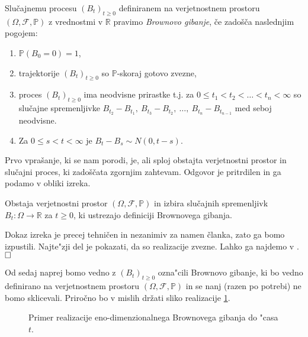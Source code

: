 \documentclass[twoside,11pt]{article}
\begin{document}
\pagebreak

\begin{definicija}
    Slučajnemu procesu $(B_t)_{t\geq 0}$ definiranem na verjetnostnem prostoru $(\Omega, \mathcal{F}, \mathbb{P})$
    z vrednostmi v $\mathbb{R}$ pravimo \textit{Brownovo gibanje}, če 
    zadošča naslednjim pogojem:
    \begin{enumerate}
        \item $\mathbb{P}(B_0 = 0) = 1$,
        \item trajektorije $(B_t)_{t\geq0}$ so $\mathbb{P}$-skoraj gotovo zvezne,
        \item proces $\left(B_t\right)_{t \geq 0}$ ima neodvisne prirastke t.j. za $0 \leq t_1 < t_2 < \dots < t_n < \infty$ so slučajne spremenljivke
            $B_{t_2} - B_{t_1}, \ B_{t_3} - B_{t_2}, \ \dots, \ B_{t_n} - B_{t_{n-1}}$ med seboj neodvisne. 
        \item Za $ 0 \leq s < t < \infty$ je $B_t - B_s \sim N(0, t-s)$.
    \end{enumerate}
\end{definicija}
        
Prvo vprašanje, ki se nam porodi, je, ali sploj obstajta verjetnostni prostor 
in slučajni proces, ki zadoščata zgornjim zahtevam. Odgovor je pritrdilen in ga 
podamo v obliki izreka.

\begin{izrek}
    Obstaja verjetnostni prostor $(\Omega, \mathcal{F}, \mathbb{P})$ in
    izbira slučajnih spremenljivk $B_t : \Omega \to \mathbb{R}$ za $t \geq 0$,
    ki ustrezajo definiciji Brownovega gibanja.
\end{izrek}

\begin{dokaz}
    Dokaz izreka je precej tehničen in nezanimiv za namen članka, zato ga bomo izpustili. Najte"zji del je 
    pokazati, da so realizacije zvezne. Lahko ga najdemo v \cite{1}. $\hfill \square$
\end{dokaz}


Od sedaj naprej bomo vedno z $(B_t)_{t\geq 0}$ ozna"cili Brownovo gibanje, ki bo vedno definirano na 
verjetnostnem prostoru $(\Omega, \mathcal{F}, \mathbb{P})$ in se nanj (razen po potrebi) ne 
bomo sklicevali. Priročno bo v mislih držati sliko realizacije  \ref{fig:slika2}.

\begin{figure}[h]
    \centering
    \caption{Primer realizacije eno-dimenzionalnega Brownovega gibanja do "casa $t$.}
    \label{fig:slika2}
\end{figure}
\end{document}

